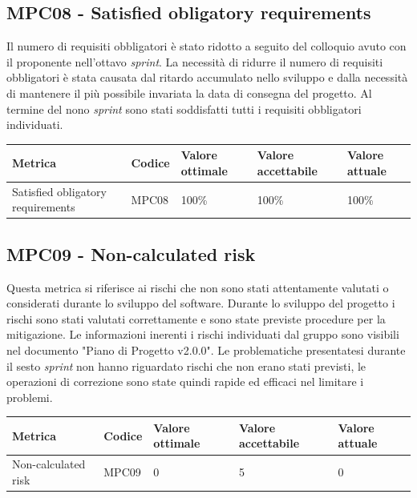 \subsection{MPC08 - Satisfied obligatory requirements}
\label{s:mpc08}
Il numero di requisiti obbligatori è stato ridotto a seguito del colloquio avuto con il proponente nell'ottavo \textit{sprint}.
La necessità di ridurre il numero di requisiti obbligatori è stata causata dal ritardo accumulato nello sviluppo e dalla necessità di mantenere il più possibile invariata la data di consegna del progetto.
Al termine del nono \textit{sprint} sono stati soddisfatti tutti i requisiti obbligatori individuati.
\begin{table}[H]
    \centering
    \begin{tabularx}{\textwidth}{X|l|l|l|l}
        \hline
        \textbf{Metrica}                  & \textbf{Codice} & \textbf{Valore ottimale} & \textbf{Valore accettabile} & \textbf{Valore attuale} \\
        \hline
        Satisfied obligatory requirements & MPC08           & 100\%                    & 100\%                       & 100\%                   \\
        \hline
    \end{tabularx}
\end{table}


\subsection{MPC09 - Non-calculated risk}
\label{s:mpc09}
Questa metrica si riferisce ai rischi che non sono stati attentamente valutati o considerati durante lo sviluppo del software.
Durante lo sviluppo del progetto i rischi sono stati valutati correttamente e sono state previste procedure per la mitigazione.
Le informazioni inerenti i rischi individuati dal gruppo sono visibili nel documento "Piano di Progetto v2.0.0".
Le problematiche presentatesi durante il sesto \textit{sprint} non hanno riguardato rischi che non erano stati previsti, le operazioni di correzione sono state quindi rapide ed efficaci nel limitare i problemi.
\begin{table}[H]
    \centering
    \begin{tabularx}{\textwidth}{X|l|l|l|l}
        \hline
        \textbf{Metrica}    & \textbf{Codice} & \textbf{Valore ottimale} & \textbf{Valore accettabile} & \textbf{Valore attuale} \\
        \hline
        Non-calculated risk & MPC09           & 0                        & 5                           & 0                       \\
        \hline
    \end{tabularx}
\end{table}


